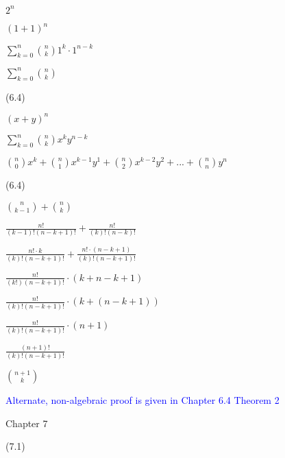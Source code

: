 \documentclass{exam}
\begin{document}
\begin{questions}
\begin{center}
\(2^n\)

\((1+1)^n\)

\(\sum_{k=0}^n {n \choose k} 1^k \cdot 1^{n-k}\)

\(\sum_{k=0}^n {n \choose k}\)

\end{center}

 (6.4)

\begin{center}
\( (x + y)^n \)

\(\sum_{k=0}^n {n \choose k} x^{k} y^{n-k}\)

\( {n \choose 0} x^k + {n \choose 1} x^{k-1}y^1 + {n \choose 2} x^{k-2}y^2 + ... + {n \choose n} y^n \)
\end{center}

 (6.4)

\begin{center}

\( { n \choose k-1 } + { n \choose k } \)

\( \frac{n!}{(k-1)!(n-k+1)!} + \frac{n!}{(k)!(n-k)!} \)

\( \frac{n! \cdot k}{(k)!(n-k+1)!} + \frac{n! \cdot (n-k+1) }{(k)!(n-k+1)!} \)

\( \frac{n!}{(k!)(n-k+1)!} \cdot (k + n-k+1) \)

\( \frac{n!}{(k)!(n-k+1)!} \cdot (k + (n - k + 1)) \)

\( \frac{n!}{(k)!(n-k+1)!} \cdot (n + 1) \)

\( \frac{(n+1)!}{(k)!(n-k+1)!} \)

\( {n+1 \choose k} \)

\textcolor{blue}{Alternate, non-algebraic proof is given in Chapter 6.4 Theorem 2}

\end{center}




\vspace{10pt}
{\Large Chapter 7}
\vspace{2pt}

 (7.1)


\end{questions}
\end{document}
